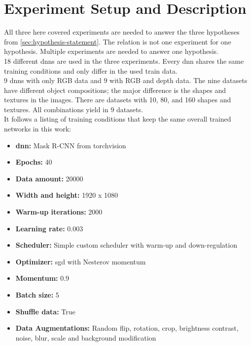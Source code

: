 \chapter{Experiment Setup and Description}
\label{chap:kapitel4}

	All three here covered experiments are needed to answer the three hypotheses from \ref{sec:hypothesis-statement}. The relation is not one experiment for one hypothesis. Multiple experiments are needed to answer one hypothesis.\\
	18 different \acl{dnn}s are used in the three experiments. Every \ac{dnn} shares the same training conditions and only differ in the used train data.\\
	9 \ac{dnn}s with only RGB data and 9 with RGB and depth data. The nine datasets have different object compositions; the major difference is the shapes and textures in the images. There are datasets with 10, 80, and 160 shapes and textures. All combinations yield in 9 datasets.\\
	It follows a listing of training conditions that keep the same overall trained networks in this work:
	\begin{itemize}
		\item \textbf{\ac{dnn}:} Mask R-CNN from torchvision
		\item \textbf{Epochs:} 40
		\item \textbf{Data amount:} 20000
		\item \textbf{Width and height:} 1920 x 1080
		\item \textbf{Warm-up iterations:} 2000
		\item \textbf{Learning rate:} 0.003
		\item \textbf{Scheduler:} Simple custom scheduler with warm-up and down-regulation
		\item \textbf{Optimizer:} \acl{sgd} with Nesterov momentum \cite{Botev2016}
		\item \textbf{Momentum:} 0.9
		\item \textbf{Batch size:} 5
		\item \textbf{Shuffle data:} True
		\item \textbf{Data Augmentations:} Random flip, rotation, crop, brightness contrast, noise, blur, scale and background modification
	\end{itemize}
	
